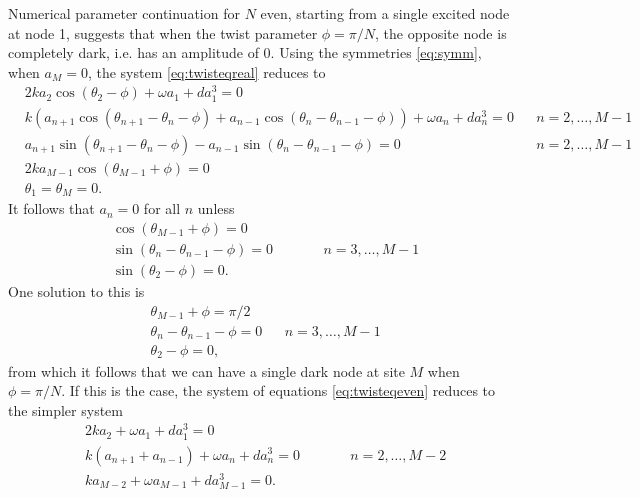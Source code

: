 \documentclass[12pt]{article}
\begin{document}
Numerical parameter continuation for $N$ even, starting from a single excited node at node 1, suggests that when the twist parameter $\phi = \pi/N$, the opposite node is completely dark, i.e. has an amplitude of 0. Using the symmetries \cref{eq:symm}, when $a_M = 0$, the system \cref{eq:twisteqreal} reduces to
\begin{equation}\label{eq:twisteqeven}
\begin{aligned}
&2 k a_2 \cos(\theta_2 - \phi) + \omega a_1 + d a_1^3 = 0 \\
&k( a_{n+1} \cos(\theta_{n+1}-\theta_n-\phi) + a_{n-1} \cos(\theta_n - \theta_{n-1}-\phi)) + \omega a_n + d a_n^3 = 0 && n = 2, \dots, M-1 \\
&a_{n+1} \sin(\theta_{n+1}-\theta_n-\phi) - a_{n-1} \sin(\theta_n - \theta_{n-1}-\phi) = 0 && n = 2, \dots, M-1 \\
&2 k a_{M-1} \cos(\theta_{M-1} + \phi) = 0 \\
& \theta_1 = \theta_M = 0.
\end{aligned}
\end{equation}
It follows that $a_n = 0$ for all $n$ unless
\begin{equation}\label{eq:evendarknodecond}
\begin{aligned}
&\cos(\theta_{M-1} + \phi) = 0 \\
&\sin(\theta_{n} - \theta_{n-1} - \phi) = 0 && \qquad n = 3, \dots, M-1 \\
&\sin(\theta_2 - \phi) = 0.
\end{aligned}
\end{equation}
One solution to this is
\begin{equation}\label{eq:evendarknodecond1}
\begin{aligned}
&\theta_{M-1} + \phi = \pi/2 \\
&\theta_{n} - \theta_{n-1} - \phi = 0 && n = 3, \dots, M-1 \\
&\theta_2 - \phi = 0,
\end{aligned}
\end{equation}
from which it follows that we can have a single dark node at site $M$ when $\phi = \pi/N$. If this is the case, the system of equations \cref{eq:twisteqeven} reduces to the simpler system 
\begin{equation}\label{eq:twisteqevenhole}
\begin{aligned}
&2 k a_2 + \omega a_1 + d a_1^3 = 0 \\
&k\left( a_{n+1} + a_{n-1} \right) + \omega a_n + d a_n^3 = 0 && \qquad n = 2, \dots, M-2 \\
&k a_{M-2} + \omega a_{M-1} + d a_{M-1}^3 = 0.
\end{aligned}
\end{equation}
\end{document}
